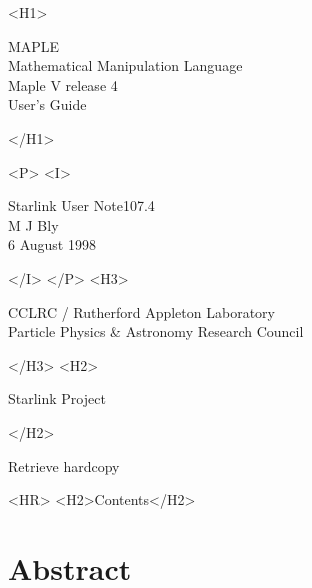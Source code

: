 \documentclass[twoside,11pt]{article}
\newcommand{\stardoccategory}  {Starlink User Note}
\newcommand{\stardocsource}    {sun\stardocnumber}
\newcommand{\stardocnumber}    {107.4}
\newcommand{\stardocauthors}   {M J Bly}
\newcommand{\stardocdate}      {6 August 1998}
\newcommand{\stardoctitle}     {MAPLE \\[2ex] 
                                Mathematical Manipulation Language}
\newcommand{\stardocversion}   {Maple V release 4}
\newcommand{\stardocmanual}    {User's Guide}
\newcommand{\htmladdnormallink}[2]{#1}
\newcommand{\htmladdimg}[1]{}
\newcommand{\htmlref}[2]{#1}
\newcommand{\htmladdtonavigation}[1]{}
\newcommand{\xlabel}[1]{}
\newcommand{\latexonlytoc}[0]{\tableofcontents}
\begin{document}
\begin{htmlonly}
   \xlabel{}
   \begin{rawhtml} <H1> \end{rawhtml}
      \stardoctitle\\
      \stardocversion\\
      \stardocmanual
   \begin{rawhtml} </H1> \end{rawhtml}


   \begin{rawhtml} <P> <I> \end{rawhtml}
   \stardoccategory \stardocnumber \\
   \stardocauthors \\
   \stardocdate
   \begin{rawhtml} </I> </P> <H3> \end{rawhtml}
      \htmladdnormallink{CCLRC}{http://www.cclrc.ac.uk} /
      \htmladdnormallink{Rutherford Appleton Laboratory}
                        {http://www.cclrc.ac.uk/ral} \\
      \htmladdnormallink{Particle Physics \& Astronomy Research Council}
                        {http://www.pparc.ac.uk} \\
   \begin{rawhtml} </H3> <H2> \end{rawhtml}
      \htmladdnormallink{Starlink Project}{http://star-www.rl.ac.uk/}
   \begin{rawhtml} </H2> \end{rawhtml}
   \htmladdnormallink{\htmladdimg{source.gif} Retrieve hardcopy}
      {http://star-www.rl.ac.uk/cgi-bin/hcserver?\stardocsource}\\

  \label{stardoccontents}
  \begin{rawhtml} 
    <HR>
    <H2>Contents</H2>
  \end{rawhtml}
  \renewcommand{\latexonlytoc}[0]{}
  \htmladdtonavigation{\htmlref{\htmladdimg{contents_motif.gif}}
        {stardoccontents}}

  \section{\xlabel{abstract}Abstract}
\end{htmlonly}
\end{document}
